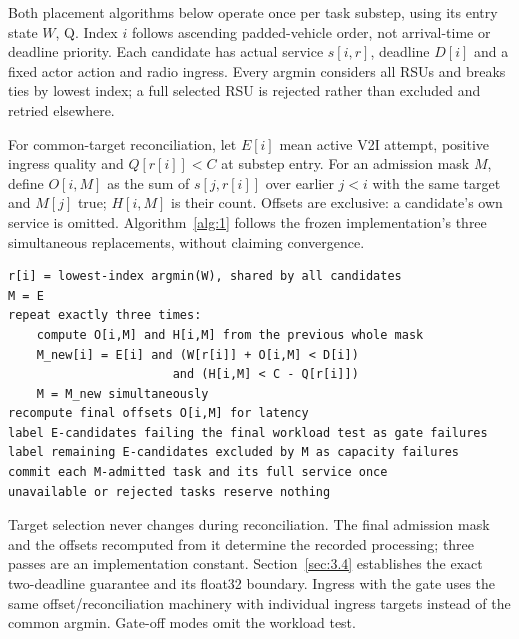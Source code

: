 \documentclass[11pt,a4paper]{article}
\begin{document}
Both placement algorithms below operate once per task substep, using its entry state $W$, Q. Index $i$ follows ascending padded-vehicle order, not arrival-time or deadline priority. Each candidate has actual service $s[i,r]$, deadline $D[i]$ and a fixed actor action and radio ingress. Every argmin considers all RSUs and breaks ties by lowest index; a full selected RSU is rejected rather than excluded and retried elsewhere.

For common-target reconciliation, let $E[i]$ mean active V2I attempt, positive ingress quality and $Q[r[i]]<C$ at substep entry. For an admission mask $M$, define $O[i,M]$ as the sum of $s[j,r[i]]$ over earlier $j<i$ with the same target and $M[j]$ true; $H[i,M]$ is their count. Offsets are exclusive: a candidate's own service is omitted. Algorithm~\ref{alg:1} follows the frozen implementation's three simultaneous replacements, without claiming convergence.

\begin{algorithm}[htbp]
\caption{common-target placement with gate (one substep)}\label{alg:1}
\begin{Verbatim}[fontsize=\small,breaklines=true]
r[i] = lowest-index argmin(W), shared by all candidates
M = E
repeat exactly three times:
    compute O[i,M] and H[i,M] from the previous whole mask
    M_new[i] = E[i] and (W[r[i]] + O[i,M] < D[i])
                       and (H[i,M] < C - Q[r[i]])
    M = M_new simultaneously
recompute final offsets O[i,M] for latency
label E-candidates failing the final workload test as gate failures
label remaining E-candidates excluded by M as capacity failures
commit each M-admitted task and its full service once
unavailable or rejected tasks reserve nothing
\end{Verbatim}
\end{algorithm}

Target selection never changes during reconciliation. The final admission mask and the offsets recomputed from it determine the recorded processing; three passes are an implementation constant. Section~\ref{sec:3.4} establishes the exact two-deadline guarantee and its float32 boundary. Ingress with the gate uses the same offset/reconciliation machinery with individual ingress targets instead of the common argmin. Gate-off modes omit the workload test.
\end{document}
